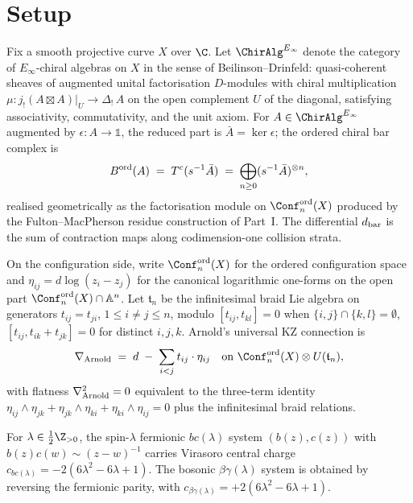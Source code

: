 \section{Setup}
\label{sec:climax-setup}

Fix a smooth projective curve \(X\) over \(\C\). Let \(\ChirAlgInf\)
denote the category of \(E_{\infty}\)-chiral algebras on \(X\) in the
sense of Beilinson--Drinfeld: quasi-coherent sheaves of augmented
unital factorisation \(D\)-modules with chiral multiplication
\(
  \mu \colon j_{!}(A \boxtimes A)|_{U} \to \Delta_{!}\,A
\)
on the open complement \(U\) of the diagonal, satisfying associativity,
commutativity, and the unit axiom. For \(A \in \ChirAlgInf\) augmented
by \(\epsilon\colon A \to \mathbb{1}\), the reduced part is
\(\bar A = \ker \epsilon\); the ordered chiral bar complex is
\[
  B^{\mathrm{ord}}(A) \;=\; T^{c}(s^{-1} \bar A) \;=\;
  \bigoplus_{n \geq 0} (s^{-1} \bar A)^{\otimes n},
\]
realised geometrically as the factorisation module on
\(\Conf_{n}^{\mathrm{ord}}(X)\) produced by the Fulton--MacPherson
residue construction of Part~I. The differential \(d_{\mathrm{bar}}\) is the sum
of contraction maps along codimension-one collision strata.

On the configuration side, write \(\Conf_{n}^{\mathrm{ord}}(X)\) for
the ordered configuration space and
\(\eta_{ij} = d\log(z_{i} - z_{j})\) for the canonical logarithmic
one-forms on the open part
\(\Conf_{n}^{\mathrm{ord}}(X) \cap \mathbb{A}^{n}\). Let
\(\mathfrak{t}_{n}\) be the infinitesimal braid Lie algebra on
generators \(t_{ij} = t_{ji}\), \(1 \leq i \neq j \leq n\), modulo
\(
  [t_{ij}, t_{kl}] = 0
\) when \(\{i,j\} \cap \{k,l\} = \emptyset\),
\(
  [t_{ij}, t_{ik} + t_{jk}] = 0
\) for distinct \(i,j,k\). Arnold's universal KZ connection is
\[
  \Arn \;=\; d \;-\; \sum_{i<j} t_{ij} \cdot \eta_{ij}
  \quad\text{on } \Conf_{n}^{\mathrm{ord}}(X) \otimes U(\mathfrak{t}_{n}),
\]
with flatness \(\nabla_{\mathrm{Arnold}}^{2} = 0\) equivalent to the three-term identity
\(\eta_{ij}\wedge\eta_{jk} + \eta_{jk}\wedge\eta_{ki} + \eta_{ki}\wedge\eta_{ij} = 0\)
plus the infinitesimal braid relations.

\begin{definition}
\label{def:bc-charge-climax}
For \(\lambda \in \tfrac12\Z_{>0}\), the spin-\(\lambda\) fermionic
\(bc(\lambda)\) system \((b(z),c(z))\) with
\(b(z)c(w) \sim (z-w)^{-1}\) carries Virasoro central charge
\(c_{bc(\lambda)} = -2(6\lambda^{2} - 6\lambda + 1)\). The bosonic
\(\beta\gamma(\lambda)\) system is obtained by reversing the fermionic
parity, with \(c_{\beta\gamma(\lambda)} = +2(6\lambda^{2}-6\lambda+1)\).
\end{definition}

